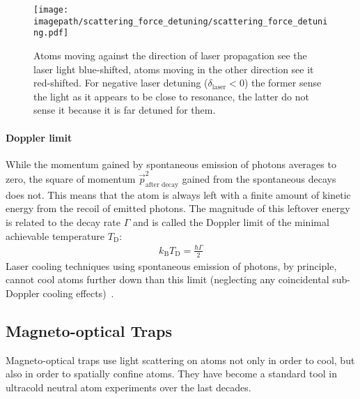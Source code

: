 \begin{figure}
    \centering
    \texttt{[image: \\imagepath/scattering\_force\_detuning/scattering\_force\_detuning.pdf]}
    \caption{Atoms moving against the direction of laser propagation see the laser light blue-shifted, atoms moving in the other direction see it red-shifted. For negative laser detuning ($\delta_\text{laser} < 0$) the former sense the light as it appears to be close to resonance, the latter do not sense it because it is far detuned for them.}\label{fig:scattering_force_detuning}
\end{figure}

\paragraph*{Doppler limit} While the momentum gained by spontaneous emission of photons averages to zero, the square of momentum $\vec p_\text{after decay}^2$ gained from the spontaneous decays does not. This means that the atom is always left with a finite amount of kinetic energy from the recoil of emitted photons. The magnitude of this leftover energy is related to the decay rate $\Gamma$ and is called the Doppler limit of the minimal achievable temperature $T_\text{D}$:
\begin{align}
    k_\text{B} T_\text{D} = \frac{\hbar \Gamma}{2}
\end{align}
Laser cooling techniques using spontaneous emission of photons, by principle, cannot cool atoms further down than this limit (neglecting any coincidental sub-Doppler cooling effects)~\cite{foot_atomic_2005}.

\subsection*{Magneto-optical Traps}
Magneto-optical traps use light scattering on atoms not only in order to cool, but also in order to spatially confine atoms. They have become a standard tool in ultracold neutral atom experiments over the last decades.

